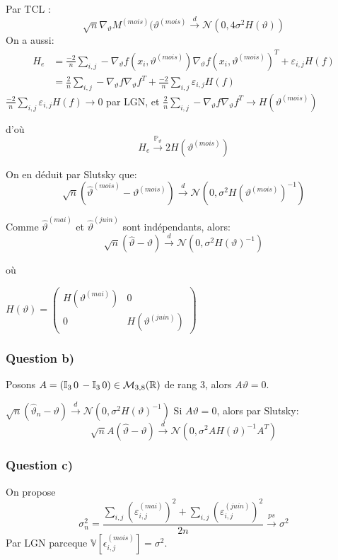 \documentclass{article}
\newcommand{\BigF}[2]{\ensuremath{#1 \left(#2\right)}}
\newcommand{\Q}[1]{\subsubsection*{Question #1}}
\begin{document}
Par TCL :
$$ \sqrt n \nabla_\vartheta M^{(mois)} (\vartheta^{(mois)} \overset{d}{\to} \mathcal{N}(0, 4 \sigma^2 H(\vartheta) )$$
On a aussi:
\begin{align*}
H_e &= \frac{-2}{n} \sum_{i, j} - \nabla_\vartheta f(x_i, \vartheta^{(mois)})\nabla_\vartheta f(x_i, \vartheta^{(mois)})^T + \varepsilon_{i,j} H(f) \\
&=  \frac{2}{n} \sum_{i, j} - \nabla_\vartheta f \nabla_\vartheta f ^T + \frac{-2}{n}  \sum_{i, j} \varepsilon_{i,j} H(f) 
\end{align*}
$ \frac{-2}{n}  \sum_{i, j} \varepsilon_{i,j} H(f) \longrightarrow 0$ par LGN, 
et $ \frac{2}{n} \sum_{i, j} - \nabla_\vartheta f \nabla_\vartheta f ^T \longrightarrow \BigF{H}{\vartheta^{(mois)}}$ 

d'où $$ H_e \overset{\mathbb{P}_{\vartheta} } \longrightarrow  2 \BigF{H}{\vartheta^{(mois)}} $$

On en déduit par Slutsky que:
$$ \sqrt n (\hat{\vartheta}^{(mois)} - \vartheta^{(mois)} ) \overset{ d } \longrightarrow \BigF{\mathcal{N}}{0, \sigma^2 \BigF{H}{\vartheta^{(mois)}}^{-1}}$$

Comme $\hat{\vartheta}^{(mai)}$ et $\hat{\vartheta}^{(juin)} $ sont indépendants, alors:
$$ \sqrt n (\hat{\vartheta}- \vartheta ) \overset{ d } \longrightarrow \BigF{\mathcal{N}}{0, \sigma^2 \BigF{H}{\vartheta}^{-1}}$$

où 
\begin{center}
\ensuremath{
\BigF{H}{\vartheta} = 
\begin{pmatrix}
 \BigF{H}{\vartheta^{(mai)}} & 0 \\
 0 & \BigF{H}{\vartheta^{(juin)}}
\end{pmatrix}
}
\end{center}

\Q{b)}
Posons $A = (\mathbb{I}_3 \,  0 \, -\mathbb{I}_3 \, 0) \in {\cal M}_{3, 8}(\mathbb{R})$ de rang $3$, alors $A \vartheta = 0$.

$\sqrt n (\hat{\vartheta}_n - \vartheta)  \overset d \longrightarrow \BigF{\mathcal{N}}{0, \sigma^2 \BigF{H}{\vartheta}^{-1}}$
Si $A \vartheta = 0$, alors par Slutsky: 
$$ \sqrt n A( \hat{\vartheta} - \vartheta ) \overset d \longrightarrow \BigF{\mathcal{N}}{0, \sigma^2 A \BigF{H}{\vartheta}^{-1}A^T}$$

\Q{c) }
On propose 
$$\sigma_n^2 = \frac{ \sum_{i,j} (\varepsilon_{i,j}^{(mai)})^2  + \sum_{i,j} (\varepsilon_{i,j}^{(juin)})^2}{2n}  \overset{ps} \longrightarrow \sigma^2$$ 
Par LGN 
parceque $\mathbb{V}[{\epsilon_{i,j}^{(mois)}}] = \sigma^2$.
\end{document}
